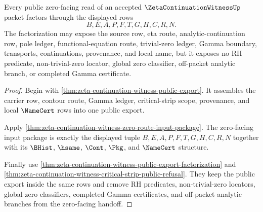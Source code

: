 \begin{theorem}
\label{thm:zeta-continuation-witness-public-zero-route-factorization}
Every public zero-facing read of an accepted $\ZetaContinuationWitnessUp$ packet factors through the displayed rows
$$
B,E,A,P,F,T,G,H,C,R,N.
$$
The factorization may expose the source row, eta route, analytic-continuation row, pole ledger, functional-equation route, trivial-zero ledger, Gamma boundary, transports, continuations, provenance, and local name, but it exposes no RH predicate, non-trivial-zero locator, global zero classifier, off-packet analytic branch, or completed Gamma certificate.
\end{theorem}
\begin{proof}
Begin with \autoref{thm:zeta-continuation-witness-public-export}. It assembles the carrier row, contour route, Gamma ledger, critical-strip scope, provenance, and local $\NameCert$ rows into one public export.

Apply \autoref{thm:zeta-continuation-witness-zero-route-input-package}. The zero-facing input package is exactly the displayed tuple $B,E,A,P,F,T,G,H,C,R,N$ together with its $\BHist$, $\hsame$, $\Cont$, $\Pkg$, and $\NameCert$ structure.

Finally use \autoref{thm:zeta-continuation-witness-public-export-factorization} and \autoref{thm:zeta-continuation-witness-critical-strip-public-refusal}. They keep the public export inside the same rows and remove RH predicates, non-trivial-zero locators, global zero classifiers, completed Gamma certificates, and off-packet analytic branches from the zero-facing handoff.
\end{proof}

